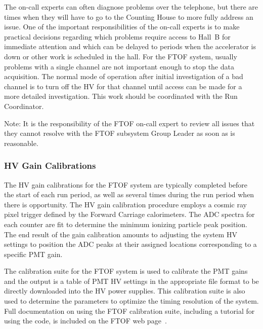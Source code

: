 \documentclass[12pt]{article}
\begin{document}
The on-call experts can often diagnose problems over the telephone, but there are times 
when they will have to go to the Counting House to more fully address an issue. One of 
the important responsibilities of the on-call experts is to make practical decisions 
regarding which problems require access to Hall~B for immediate attention and which can 
be delayed to periods when the accelerator is down or other work is scheduled in the 
hall. For the FTOF system, usually problems with a single channel are not important 
enough to stop the data acquisition. The normal mode of operation after initial 
investigation of a bad channel is to turn off the HV for that channel until access can 
be made for a more detailed investigation. This work should be coordinated with the Run 
Coordinator.

Note: It is the responsibility of the FTOF on-call expert to review all issues that 
they cannot resolve with the FTOF subsystem Group Leader as soon as is reasonable.

\subsubsection{HV Gain Calibrations}
\label{gain-calib}

The HV gain calibrations for the FTOF system are typically completed before the start 
of each run period, as well as several times during the run period when there is 
opportunity. The HV gain calibration procedure employs a cosmic ray pixel trigger 
defined by the Forward Carriage calorimeters. The ADC spectra for each counter are fit 
to determine the minimum ionizing particle peak position. The end result of the gain 
calibration amounts to adjusting the system HV settings to position the ADC peaks at 
their assigned locations corresponding to a specific PMT gain.

The calibration suite for the FTOF system is used to calibrate the PMT gains and the 
output is a table of PMT HV settings in the appropriate file format to be directly 
downloaded into the HV power supplies. This calibration suite is also used to determine 
the parameters to optimize the timing resolution of the system. Full documentation on 
using the FTOF calibration suite, including a tutorial for using the code, is included 
on the FTOF web page~\cite{ftof-web}.
\end{document}
